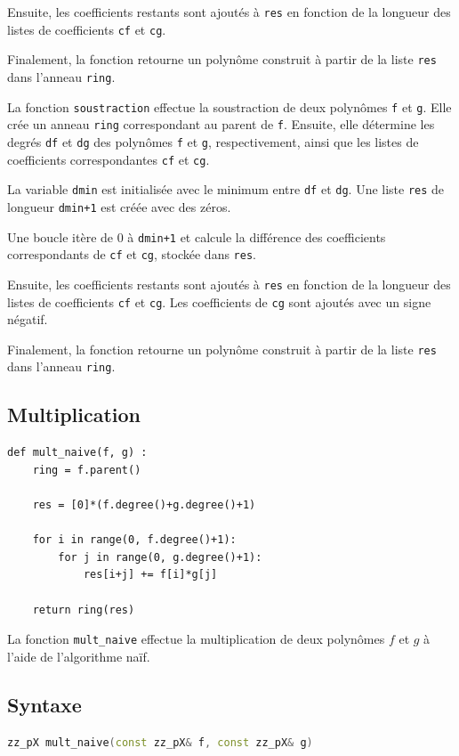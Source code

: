 \documentclass[a4paper]{article}
\begin{document}
Ensuite, les coefficients restants sont ajoutés à \texttt{res} en fonction de la longueur des listes de coefficients \texttt{cf} et \texttt{cg}.

Finalement, la fonction retourne un polynôme construit à partir de la liste \texttt{res} dans l'anneau \texttt{ring}.

La fonction \texttt{soustraction} effectue la soustraction de deux polynômes \texttt{f} et \texttt{g}. Elle crée un anneau \texttt{ring} correspondant au parent de \texttt{f}. Ensuite, elle détermine les degrés \texttt{df} et \texttt{dg} des polynômes \texttt{f} et \texttt{g}, respectivement, ainsi que les listes de coefficients correspondantes \texttt{cf} et \texttt{cg}.

La variable \texttt{dmin} est initialisée avec le minimum entre \texttt{df} et \texttt{dg}. Une liste \texttt{res} de longueur \texttt{dmin+1} est créée avec des zéros.

Une boucle itère de 0 à \texttt{dmin+1} et calcule la différence des coefficients correspondants de \texttt{cf} et \texttt{cg}, stockée dans \texttt{res}.

Ensuite, les coefficients restants sont ajoutés à \texttt{res} en fonction de la longueur des listes de coefficients \texttt{cf} et \texttt{cg}. Les coefficients de \texttt{cg} sont ajoutés avec un signe négatif.

Finalement, la fonction retourne un polynôme construit à partir de la liste \texttt{res} dans l'anneau \texttt{ring}.


\subsection{Multiplication}

\begin{lstlisting}[frame=leftline, title={multiplication naive}]
    def mult_naive(f, g) :
    ring = f.parent()
  
    res = [0]*(f.degree()+g.degree()+1) 
    
    for i in range(0, f.degree()+1):
        for j in range(0, g.degree()+1):
            res[i+j] += f[i]*g[j]

    return ring(res) 
\end{lstlisting}
La fonction \texttt{mult\_naive} effectue la multiplication de deux polynômes $f$ et $g$ à l'aide de l'algorithme naïf.
\subsection*{Syntaxe}
\begin{lstlisting}[language=C++]
zz_pX mult_naive(const zz_pX& f, const zz_pX& g)
\end{lstlisting}
\end{document}
